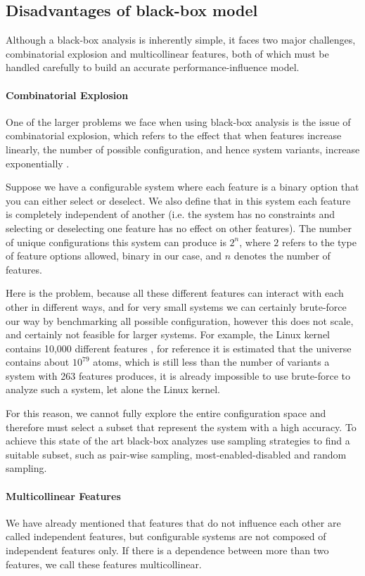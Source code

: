 \subsection{Disadvantages of black-box model}
Although a black-box analysis is inherently simple, it faces two major challenges, combinatorial explosion and multicollinear features, both of which
must be handled carefully to build an accurate performance-influence model.

\paragraph{Combinatorial Explosion}
One of the larger problems we face when using black-box analysis is the issue of combinatorial explosion, 
which refers to the effect that when features increase linearly, the number of possible configuration, and hence system variants,
increase exponentially \cite{Combinatorial-explosion}.

Suppose we have a configurable system where each feature is a binary option that you can either select or deselect. We also define 
that in this system each feature is completely independent of another (i.e. the system has no constraints and selecting or deselecting one feature
has no effect on other features). The number of unique configurations this system can produce is $2^n$, where $2$ refers to
the type of feature options allowed, binary in our case, and $n$ denotes the number of features. 

Here is the problem, because all these different features can interact with each other in different ways, and for very small systems
we can certainly brute-force our way by benchmarking all possible configuration, however this does not scale, and certainly not feasible for 
larger systems. For example, the Linux kernel contains 10,000 different features \cite{Linux-Kernel}, for reference it is estimated that the universe
contains about $10^{79}$ atoms, which is still less than the number of variants a system with 263 features produces, it is already impossible to use brute-force to analyze
such a system, let alone the Linux kernel.

For this reason, we cannot fully explore the entire configuration space 
and therefore must select a subset that represent the system with a high accuracy. To achieve this state of the art black-box analyzes use sampling
strategies to find a suitable subset, such as pair-wise sampling, most-enabled-disabled and random sampling.

\paragraph{Multicollinear Features}\label{ColinearF}
We have already mentioned that features that do not influence each other are called independent features, but configurable systems are not composed
of independent features only. If there is a dependence between more than two features, we call these features multicollinear.

